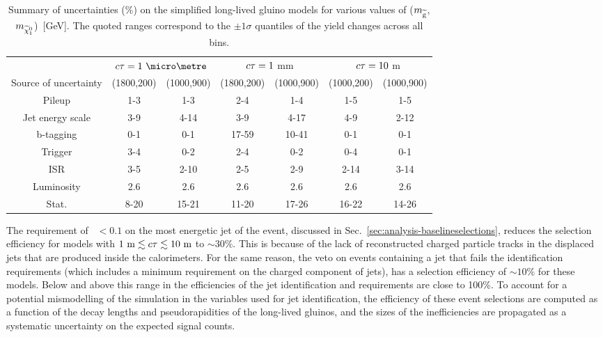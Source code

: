 \begin{table}[t]
\centering
\footnotesize
\begin{tabular}{c|cc|cc|cc}
\hline
& \multicolumn{2}{c|}{$\ctau=1~\micro\metre$} & \multicolumn{2}{c|}{$c\tau=1$ 
mm} & \multicolumn{2}{c}{$c\tau=10$ m} \\
Source of uncertainty & (1800,200) & (1000,900) & (1800,200) & 
(1000,900) & (1000,200) & (1000,900) \\   
\hline
Pileup & 1-3 & 1-3 & 2-4 & 1-4 & 1-5 & 1-5 \\
Jet energy scale & 3-9 & 4-14 & 3-9 & 4-17 & 4-9 & 2-12 \\
b-tagging & 0-1 & 0-1 & 17-59 & 10-41 & 0-1 & 0-1 \\
Trigger & 3-4 & 0-2 & 2-4 & 0-2 & 0-4 & 0-1 \\
ISR & 3-5 & 2-10 & 2-5 & 2-9 & 2-14 & 3-14 \\
Luminosity & 2.6 & 2.6 & 2.6 & 2.6 & 2.6 & 2.6 \\
Stat. & 8-20 & 15-21 & 11-20 & 17-26 & 16-22 & 14-26 \\
\hline
\end{tabular}
\caption{Summary of uncertainties (\%) on the simplified long-lived gluino 
models for various values of ($m_{\mathrm{\widetilde{g}}}$,$m_{\widetilde{\chi}_1^0}$)~[GeV]. The 
quoted ranges correspond to the $\pm1\sigma$ quantiles of the yield changes 
across all \njnbhtmht bins.}
\label{tab:systs-signal}
\end{table}


The requirement of \chf~$<0.1$ on the most energetic jet of the event, 
discussed in Sec.~\ref{sec:analysis-baselineselections}, reduces the selection 
efficiency for models with $1~\mathrm{m} \lesssim c\tau \lesssim 
10~\mathrm{m}$ to $\sim30\%$. This is because of the lack of reconstructed 
charged particle tracks in the displaced jets that are produced inside the 
calorimeters. 
For the same reason, the veto on events containing a jet that fails the 
identification requirements (which includes a minimum requirement on the 
charged component of jets), has a selection efficiency of $\sim10\%$ for these 
models.
Below and above this range in \ctau the efficiencies of the jet identification 
and \chf requirements are close to 100\%.
To account for a potential mismodelling of the simulation in the variables used 
for jet identification, the efficiency of these event selections are computed 
as a function of the decay lengths and pseudorapidities of the long-lived 
gluinos, and the sizes of the inefficiencies are propagated as a systematic 
uncertainty on the expected signal counts. 

